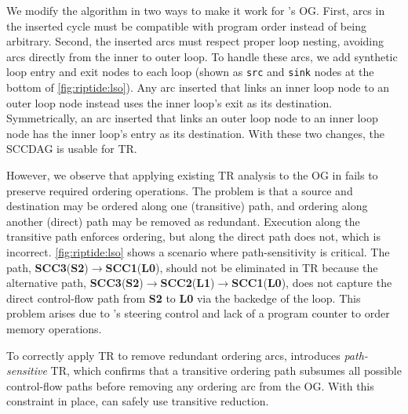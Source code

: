 We modify the algorithm in two ways to make it work for \riptide's OG.
First, arcs in the inserted cycle must be compatible with program order
instead of being arbitrary.  Second, the inserted arcs must
respect proper loop nesting, avoiding arcs directly from the inner to outer
loop.  To handle these arcs, we add synthetic loop entry and exit nodes to
each loop (shown as \texttt{src} and \texttt{sink} nodes at the bottom 
of \autoref{fig:riptide:lso}). Any arc inserted %
that links an inner loop node to an outer loop node instead uses the inner 
loop's exit as its destination.
Symmetrically, an arc inserted that links an outer loop node to an inner loop
node has the inner loop's entry as its destination.   With these two changes,
the SCCDAG is usable for TR.
%
%

However, we observe that applying existing TR analysis to the OG in \riptide fails to
preserve required ordering operations.
%
The problem is that a source and destination may be ordered along one
(transitive) path, and ordering along another (direct) path may be removed as
redundant.  Execution along the transitive path enforces ordering, but along the direct path does not, which is incorrect.
%
\autoref{fig:riptide:lso} shows a scenario where path-sensitivity is critical.
%
The path, \textbf{SCC3}(\textbf{S2})$\rightarrow$\textbf{SCC1}(\textbf{L0}), should not be eliminated 
in TR because the alternative path, \textbf{SCC3}(\textbf{S2})$\rightarrow$\textbf{SCC2}(\textbf{L1})$\rightarrow$\textbf{SCC1}(\textbf{L0}), does not  capture the direct control-flow path from \textbf{S2} to
\textbf{L0} via the backedge of the loop.
%
This problem arises due to \riptide's steering control and lack of a program
counter to order memory operations.

To correctly apply TR to remove redundant ordering arcs, \riptide introduces
\emph{path-sensitive} TR,
%
which confirms that a transitive ordering path
subsumes all possible control-flow paths
before removing any ordering arc from the OG.
%
With this constraint in place,
\riptide can safely use transitive reduction.

